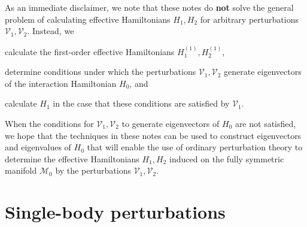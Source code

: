 \documentclass[nofootinbib,notitlepage,11pt]{revtex4-2}
\newcommand{\1}{\mathds{1}}
\newcommand{\M}{\mathcal{M}}
\newcommand{\V}{\mathcal{V}}
\begin{document}
As an immediate disclaimer, we note that these notes do {\bf not}
solve the general problem of calculating effective Hamiltonians
$H_1,H_2$ for arbitrary perturbations $\V_1,\V_2$.  Instead, we
\begin{enumerate*}
\item calculate the first-order effective Hamiltonians
  $H_1^{(1)},H_2^{(1)}$,
\item determine conditions under which the perturbations $\V_1,\V_2$
  generate eigenvectors of the interaction Hamiltonian $H_0$, and
\item calculate $H_1$ in the case that these conditions are satisfied
  by $\V_1$.
\end{enumerate*}
When the conditions for $\V_1,\V_2$ to generate eigenvectors of $H_0$
are not satisfied, we hope that the techniques in these notes can be
used to construct eigenvectors and eigenvalues of $H_0$ that will
enable the use of ordinary perturbation theory to determine the
effective Hamiltonians $H_1,H_2$ induced on the fully symmetric
manifold $\M_0$ by the perturbations $\V_1,\V_2$.

\section{Single-body perturbations}
\end{document}
